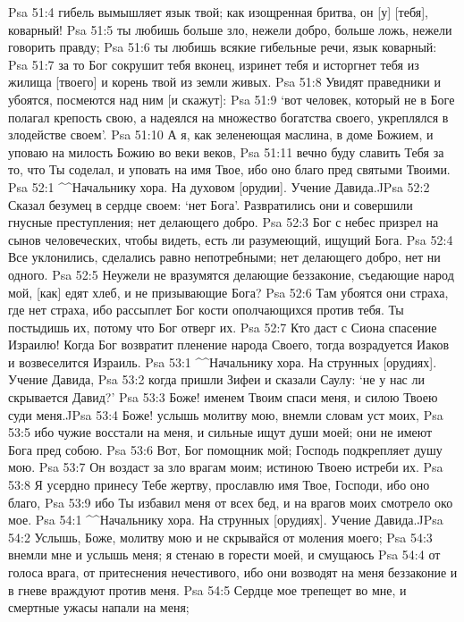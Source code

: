 Psa 51:4  гибель вымышляет язык твой; как изощренная бритва, он [у] [тебя], коварный!
Psa 51:5  ты любишь больше зло, нежели добро, больше ложь, нежели говорить правду;
Psa 51:6  ты любишь всякие гибельные речи, язык коварный:
Psa 51:7  за то Бог сокрушит тебя вконец, изринет тебя и исторгнет тебя из жилища [твоего] и корень твой из земли живых.
Psa 51:8  Увидят праведники и убоятся, посмеются над ним [и скажут]:
Psa 51:9  `вот человек, который не в Боге полагал крепость свою, а надеялся на множество богатства своего, укреплялся в злодействе своем'.
Psa 51:10  А я, как зеленеющая маслина, в доме Божием, и уповаю на милость Божию во веки веков,
Psa 51:11  вечно буду славить Тебя за то, что Ты соделал, и уповать на имя Твое, ибо оно благо пред святыми Твоими.
Psa 52:1  ^^Начальнику хора. На духовом [орудии]. Учение Давида.^^
Psa 52:2  Сказал безумец в сердце своем: `нет Бога'. Развратились они и совершили гнусные преступления; нет делающего добро.
Psa 52:3  Бог с небес призрел на сынов человеческих, чтобы видеть, есть ли разумеющий, ищущий Бога.
Psa 52:4  Все уклонились, сделались равно непотребными; нет делающего добро, нет ни одного.
Psa 52:5  Неужели не вразумятся делающие беззаконие, съедающие народ мой, [как] едят хлеб, и не призывающие Бога?
Psa 52:6  Там убоятся они страха, где нет страха, ибо рассыплет Бог кости ополчающихся против тебя. Ты постыдишь их, потому что Бог отверг их.
Psa 52:7  Кто даст с Сиона спасение Израилю! Когда Бог возвратит пленение народа Своего, тогда возрадуется Иаков и возвеселится Израиль.
Psa 53:1  ^^Начальнику хора. На струнных [орудиях]. Учение Давида,
Psa 53:2  когда пришли Зифеи и сказали Саулу: `не у нас ли скрывается Давид?'
Psa 53:3  Боже! именем Твоим спаси меня, и силою Твоею суди меня.^^
Psa 53:4  Боже! услышь молитву мою, внемли словам уст моих,
Psa 53:5  ибо чужие восстали на меня, и сильные ищут души моей; они не имеют Бога пред собою.
Psa 53:6  Вот, Бог помощник мой; Господь подкрепляет душу мою.
Psa 53:7  Он воздаст за зло врагам моим; истиною Твоею истреби их.
Psa 53:8  Я усердно принесу Тебе жертву, прославлю имя Твое, Господи, ибо оно благо,
Psa 53:9  ибо Ты избавил меня от всех бед, и на врагов моих смотрело око мое.
Psa 54:1  ^^Начальнику хора. На струнных [орудиях]. Учение Давида.^^
Psa 54:2  Услышь, Боже, молитву мою и не скрывайся от моления моего;
Psa 54:3  внемли мне и услышь меня; я стенаю в горести моей, и смущаюсь
Psa 54:4  от голоса врага, от притеснения нечестивого, ибо они возводят на меня беззаконие и в гневе враждуют против меня.
Psa 54:5  Сердце мое трепещет во мне, и смертные ужасы напали на меня;
